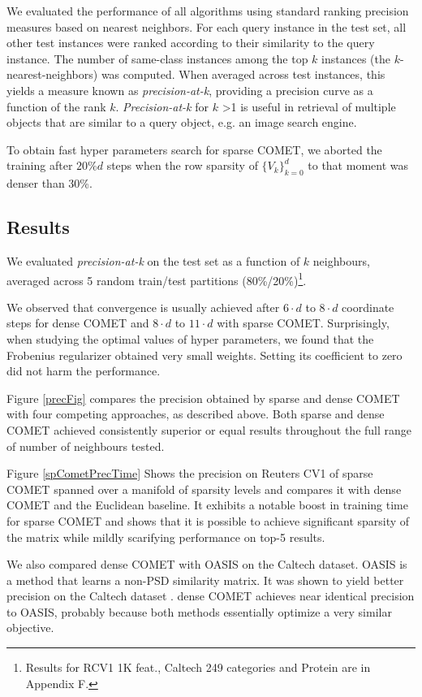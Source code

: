 \documentclass[twoside,11pt]{article}
\newcommand\mat[1]{{#1}}
\newcommand{\ignore}[1]{}
\newcommand{\Vk}{\mat{V_k}}
\newcommand{\Vg}{\{\Vk\}_{k=0}^{d}} %
\begin{document}
We evaluated the performance of all algorithms using standard ranking precision measures based on nearest neighbors. For each query instance in the test set, all other test instances were ranked according to their similarity to the query instance. The number of same-class instances
among the top $k$ instances (the $k$-nearest-neighbors) was computed. When averaged across test
instances, this yields a measure known as \textit{precision-at-k},
providing a precision curve as a function of the rank $k$. \textit{Precision-at-k} for $k$ >1 is useful in retrieval of multiple objects that are similar to a query object, e.g. an image search engine.

To obtain fast hyper parameters search for sparse COMET, we aborted the training after $20\% d$ steps when the row sparsity of $\Vg$ to that moment was denser than 30\%. 

\subsection{Results}
We evaluated \textit{precision-at-k} on the test set as a function of $k$ neighbours, averaged across 5 random train/test partitions (80\%/20\%)\footnote{Results for RCV1 1K feat., Caltech 249 categories and Protein are in Appendix F.}.
\ignore{Figure \ref{cometConvergeFig} shows the \textit{precision-at-k} over the test sets as it progresses during learning. 
}
We observed that convergence is usually achieved after $6 \cdot d$ to $8 \cdot d$ coordinate steps for dense COMET and $8 \cdot d$ to $11 \cdot d$ with sparse COMET.
Surprisingly, when studying the optimal values of hyper parameters, we found that the Frobenius regularizer obtained very small weights. Setting its coefficient to zero did not harm the performance. 

Figure \ref{precFig} compares the precision obtained by sparse and dense COMET with four competing approaches, as described above. Both sparse and dense COMET achieved consistently superior or equal results throughout the full range of number of neighbours tested.

Figure \ref{spCometPrecTime} Shows the precision on Reuters CV1 of sparse COMET spanned over a manifold of sparsity levels and compares it with dense COMET and the Euclidean baseline. It exhibits a notable boost in training time for sparse COMET and shows that it is possible to achieve significant sparsity of the matrix while mildly scarifying performance on top-5 results.

We also compared dense COMET with OASIS on the Caltech dataset. OASIS is a method that learns a non-PSD similarity matrix. It was shown to yield better precision on the Caltech dataset \citep{OASIS}. dense COMET achieves near identical precision to OASIS, probably because both methods essentially optimize a very similar objective.
\end{document}
